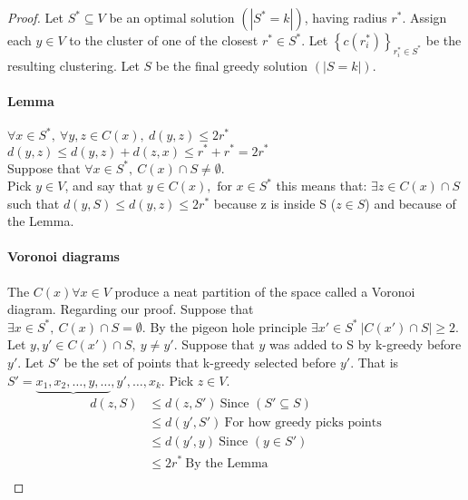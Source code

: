 \documentclass[]{article}
\begin{document}
\begin{proof}
	Let $ S^* \subseteq V $ be an optimal solution $ \left(|S^* = k|\right)  $, having radius $ r^* $. Assign each $ y \in V $ to the cluster of one of the closest $ r^* \in S^* $. Let $ {\left\{ c \left( r_i^* \right) \right\}}_{r_i^* \in S^* }  $ be the resulting clustering.
	Let $ S $ be the final greedy solution $ \left(|S = k|\right)  $.
	
	\paragraph{Lemma} $ \forall x \in S^*,\ \forall y,z \in C(x),\ d(y,z) \leq 2r^* $\\
	$ d(y,z) \leq d(y,z) + d(z,x) \leq r^* + r^* = 2r^* $\\
	
	Suppose that $ \forall x \in S^*,\ C(x) \cap S \neq \emptyset $.\\
	Pick $ y \in V $, and say that $ y\in C(x), \text{ for } x \in S^* $ this means that: $ \exists z \in C(x) \cap S $ such that $ d(y, S) \leq d(y, z) \leq 2r^*$ because z is inside S ($ z \in S $) and because of the Lemma.
	
	\paragraph{Voronoi diagrams} The $ C(x) \forall x \in V $ produce a neat partition of the space called a Voronoi diagram. Regarding our proof. Suppose that\\
	$ \exists x \in S^*,\ C(x) \cap S = \emptyset $. By the pigeon hole principle $ \exists x' \in S^*\ |C(x') \cap S| \geq 2 $. Let $ y, y' \in C(x') \cap S,\ y\neq y' $. Suppose that $ y $ was added to S by k-greedy before $ y' $. Let $ S' $ be the set of points that k-greedy selected before $ y' $. That is $ S' = \underbrace{x_1, x_2, \dots , y, \dots}, y', \dots , x_k  $. Pick $ z \in V $. 
	\begin{align*}
	d(z, S) &\leq d(z, S')\ \text{Since } (S'\subseteq S)\\
	&\leq d(y', S')\ \text{For how greedy picks points}\\
	&\leq d(y', y)\ \text{Since } (y \in S')\\
	&\leq 2r^*\ \text{By the Lemma }\\	
	\end{align*}
\end{proof}
\end{document}
